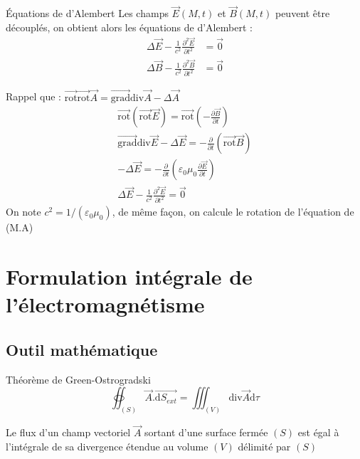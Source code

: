 \begin{Prop}{Équations de d'Alembert}{}
Les champs $\overrightarrow{E} (M,t)$ et $\overrightarrow{B} (M,t)$ peuvent être découplés, on obtient alors les équations de d'Alembert :
\begin{align*}
    \Delta \overrightarrow{E}  - \frac{1}{c^{2}} \frac{\partial ^{2}\overrightarrow{E} }{\partial t^{2}}  &= \overrightarrow{0} \\
    \Delta \overrightarrow{B}  - \frac{1}{c^{2}} \frac{\partial ^{2}\overrightarrow{B} }{\partial t^{2}}  &= \overrightarrow{0}
\end{align*}
\end{Prop}

\begin{myproof} Rappel que : $\overrightarrow{\mathrm{rot}}\overrightarrow{\mathrm{rot}}\overrightarrow{A} = \overrightarrow{\mathrm{grad}}\mathrm{div}\overrightarrow{A} - \Delta \overrightarrow{A}$
\begin{gather*}
    \overrightarrow{\mathrm{rot} } (\overrightarrow{\mathrm{rot} } \overrightarrow{E}) = \overrightarrow{\mathrm{rot} } \left( - \frac{\partial \overrightarrow{B} }{\partial t}  \right)  \\
\overrightarrow{\mathrm{grad} } \mathrm{div} \overrightarrow{E}  - \Delta \overrightarrow{E}  = - \frac{\partial }{\partial t} (\overrightarrow{\mathrm{rot} } \overrightarrow{B} )\\
-\Delta \overrightarrow{E}  = - \frac{\partial }{\partial t} \left( \varepsilon_0 \mu_0 \frac{\partial \overrightarrow{E} }{\partial t}  \right)  \\
    \Delta \overrightarrow{E}  - \frac{1}{c^{2}} \frac{\partial ^{2}\overrightarrow{E} }{\partial t^{2}}  = \overrightarrow{0}
\end{gather*}
On note $c^{2} = 1 / (\varepsilon_0 \mu_0)$, de même façon, on calcule le rotation de l'équation de (M.A)
\end{myproof}


\newpage
\section{Formulation intégrale de l'électromagnétisme} %

\subsection{Outil mathématique} %
\label{sub:Outil mathématique}

\label{sec:Formulation intégrale de l'électromagnétisme}
\begin{Theorem}{Théorème de Green-Ostrogradski}{}
\begin{equation}
  \oiint _{(S)} \overrightarrow{A}. \overrightarrow{\mathrm{d}S _{ext}} = \iiint _{(V)} \mathrm{div} \overrightarrow{A} \mathrm{d} \tau
\end{equation}

Le flux d'un champ vectoriel $\overrightarrow{A}$ sortant d'une surface fermée $(S)$ est égal à l'intégrale de sa divergence étendue au volume $(V)$ délimité par $(S)$
\end{Theorem}

